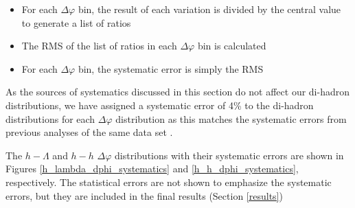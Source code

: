 \documentclass[ALICE,manyauthors]{ALICE_analysis_notes}
\begin{document}
\begin{itemize}
\item For each $\Delta\varphi$ bin, the result of each variation is divided by the central value to generate a list of ratios
\item The RMS of the list of ratios in each $\Delta\varphi$ bin is calculated
\item For each $\Delta\varphi$ bin, the systematic error is simply the RMS
\end{itemize}

As the sources of systematics discussed in this section do not affect our di-hadron distributions, we have assigned a systematic error of 4\% to the di-hadron distributions for each $\Delta\varphi$ distribution as this matches the systematic errors from previous analyses of the same data set \cite{JUSTINS PAPER}.

The $h-\Lambda$ and $h-h$ $\Delta\varphi$ distributions with their systematic errors are shown in Figures \ref{h_lambda_dphi_systematics} and \ref{h_h_dphi_systematics}, respectively. The statistical errors are not shown to emphasize the systematic errors, but they are included in the final results (Section \ref{results})
\end{document}

